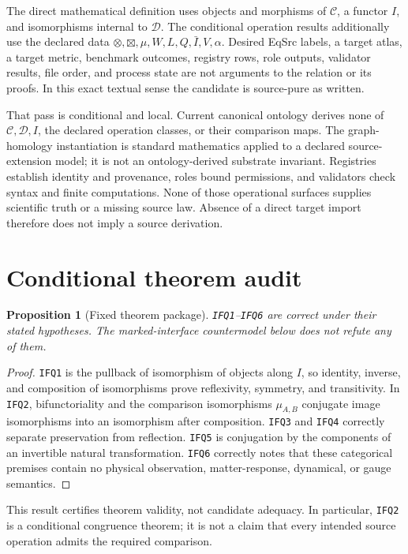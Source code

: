 \documentclass[11pt]{article}
\newtheorem{proposition}{Proposition}
\begin{document}
The direct mathematical definition uses objects and morphisms of
\(\mathcal C\), a functor \(I\), and isomorphisms internal to
\(\mathcal D\).  The conditional operation results additionally use the
declared data \(\otimes,\boxtimes,\mu,W,L,Q,\bar I,V,\alpha\).  Desired
EqSrc labels, a target atlas, a target metric, benchmark outcomes, registry
rows, role outputs, validator results, file order, and process state are not
arguments to the relation or its proofs.  In this exact textual sense the
candidate is source-pure as written.

That pass is conditional and local.  Current canonical ontology derives none
of \(\mathcal C,\mathcal D,I\), the declared operation classes, or their
comparison maps.  The graph-homology instantiation is standard mathematics
applied to a declared source-extension model; it is not an ontology-derived
substrate invariant.  Registries establish identity and provenance, roles
bound permissions, and validators check syntax and finite computations.  None
of those operational surfaces supplies scientific truth or a missing source
law.  Absence of a direct target import therefore does not imply a source
derivation.

\section{Conditional theorem audit}

\begin{proposition}[Fixed theorem package]
\texttt{IFQ1}--\texttt{IFQ6} are correct under their stated hypotheses.
The marked-interface countermodel below does not refute any of them.
\end{proposition}
\begin{proof}
\texttt{IFQ1} is the pullback of isomorphism of objects along \(I\), so
identity, inverse, and composition of isomorphisms prove reflexivity,
symmetry, and transitivity.  In \texttt{IFQ2}, bifunctoriality and the
comparison isomorphisms \(\mu_{A,B}\) conjugate image isomorphisms into an
isomorphism after composition.  \texttt{IFQ3} and \texttt{IFQ4} correctly
separate preservation from reflection.  \texttt{IFQ5} is conjugation by the
components of an invertible natural transformation.  \texttt{IFQ6} correctly
notes that these categorical premises contain no physical observation,
matter-response, dynamical, or gauge semantics.
\end{proof}

This result certifies theorem validity, not candidate adequacy.  In
particular, \texttt{IFQ2} is a conditional congruence theorem; it is not a
claim that every intended source operation admits the required comparison.
\end{document}
